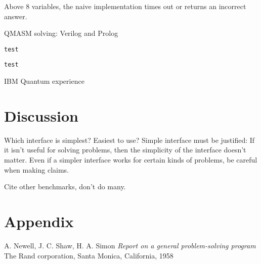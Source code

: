\documentclass{article}
\begin{document}
Above 8 variables, the naive implementation times out or returns an incorrect answer.

\newpage

QMASM solving: Verilog and Prolog

\lstset{language=Verilog}
\begin{lstlisting}
test
\end{lstlisting}

\lstset{language=Prolog}
\begin{lstlisting}
test
\end{lstlisting}

\newpage

IBM Quantum experience



\section{Discussion}

Which interface is simplest? Easiest to use?
Simple interface must be justified: If it isn't useful for solving problems, then the simplicity of the interface doesn't matter.
Even if a simpler interface works for certain kinds of problems, be careful when making claims.

Cite other benchmarks, don't do many.

\section{Appendix}

\begin{thebibliography}{9}
        A. Newell, J. C. Shaw, H. A. Simon
        \textit{Report on a general problem-solving program}
        The Rand corporation, Santa Monica, California, 1958
\end{thebibliography}
\end{document}
